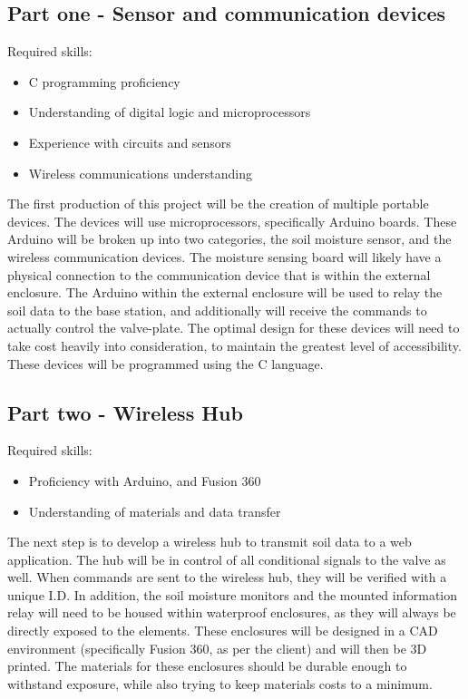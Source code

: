 \documentclass[onecolumn, draftclsnofoot,10pt, compsoc]{IEEEtran}
\begin{document}
	\subsection{Part one - Sensor and communication devices}
	Required skills:
	\begin{itemize}
		\item C programming proficiency
		\item Understanding of digital logic and microprocessors
		\item Experience with circuits and sensors
		\item Wireless communications understanding
	\end{itemize}
	The first production of this project will be the creation of multiple portable devices.
	The devices will use microprocessors, specifically Arduino boards.
	These Arduino will be broken up into two categories, the soil moisture sensor, and the wireless communication devices.
	The moisture sensing board will likely have a physical connection to the communication device that is within the external enclosure.
	The Arduino within the external enclosure will be used to relay the soil data to the base station, and additionally will receive the commands to actually control the valve-plate.
	The optimal design for these devices will need to take cost heavily into consideration, to maintain the greatest level of accessibility.
	These devices will be programmed using the C language.
	
	\subsection{Part two - Wireless Hub}
	Required skills:
	\begin{itemize}
		\item Proficiency with Arduino, and Fusion 360
		\item Understanding of materials and data transfer
	\end{itemize}
	
	The next step is to develop a wireless hub to transmit soil data to a web application. 
    The hub will be in control of all conditional signals to the valve as well. When commands are sent to the wireless hub, they will be verified with a unique I.D. 
	In addition, the soil moisture monitors and the mounted information relay will need to be housed within waterproof enclosures, as they will always be directly exposed to the elements.
	These enclosures will be designed in a CAD environment (specifically Fusion 360, as per the client) and will then be 3D printed.
	The materials for these enclosures should be durable enough to withstand exposure, while also trying to keep materials costs to a minimum.
	
\end{document}
